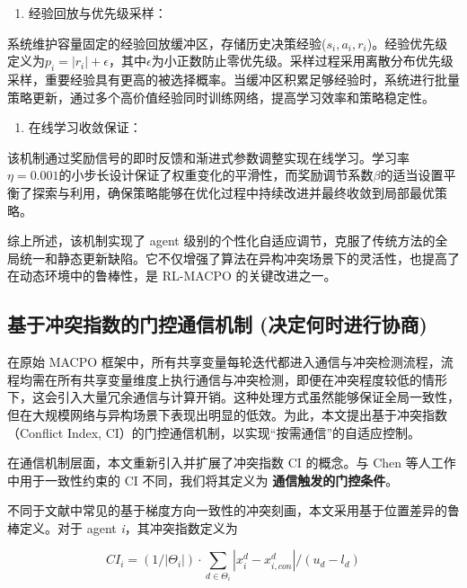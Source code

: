 \documentclass[12pt]{ctexart}
\begin{document}
\begin{enumerate}
\def\labelenumi{\alph{enumi})}
\setcounter{enumi}{3}
\item
  经验回放与优先级采样：
\end{enumerate}

系统维护容量固定的经验回放缓冲区，存储历史决策经验(\(s_{i},a_{i},r_{i}\))。经验优先级定义为\(p_{i} = \left| r_{i} \right| + \epsilon\)，其中\(\epsilon\)为小正数防止零优先级。采样过程采用离散分布优先级采样，重要经验具有更高的被选择概率。当缓冲区积累足够经验时，系统进行批量策略更新，通过多个高价值经验同时训练网络，提高学习效率和策略稳定性。

\begin{enumerate}
\def\labelenumi{\alph{enumi})}
\setcounter{enumi}{4}
\item
  在线学习收敛保证：
\end{enumerate}

该机制通过奖励信号的即时反馈和渐进式参数调整实现在线学习。学习率\(\eta = 0.001\)的小步长设计保证了权重变化的平滑性，而奖励调节系数\(\beta\)的适当设置平衡了探索与利用，确保策略能够在优化过程中持续改进并最终收敛到局部最优策略。

综上所述，该机制实现了 agent
级别的个性化自适应调节，克服了传统方法的全局统一和静态更新缺陷。它不仅增强了算法在异构冲突场景下的灵活性，也提高了在动态环境中的鲁棒性，是
RL-MACPO 的关键改进之一。

\subsection{基于冲突指数的门控通信机制
(决定何时进行协商)}\label{ux57faux4e8eux51b2ux7a81ux6307ux6570ux7684ux95e8ux63a7ux901aux4fe1ux673aux5236-ux51b3ux5b9aux4f55ux65f6ux8fdbux884cux534fux5546}

在原始 MACPO
框架中，所有共享变量每轮迭代都进入通信与冲突检测流程，流程均需在所有共享变量维度上执行通信与冲突检测，即便在冲突程度较低的情形下，这会引入大量冗余通信与计算开销。这种处理方式虽然能够保证全局一致性，但在大规模网络与异构场景下表现出明显的低效。为此，本文提出基于冲突指数（Conflict
Index, CI）的门控通信机制，以实现``按需通信''的自适应控制。

在通信机制层面，本文重新引入并扩展了冲突指数 CI 的概念。与 Chen
等人工作中用于一致性约束的 CI 不同，我们将其定义为
\textbf{通信触发的门控条件}。

不同于文献中常见的基于梯度方向一致性的冲突刻画，本文采用基于位置差异的鲁棒定义。对于
agent \emph{i}，其冲突指数定义为

\[CI_{i} = (1\text{/}|\Theta_{i}|) \cdot \sum_{d \in \Theta_{i}}^{}|x_{i}^{d} - x_{i,con}^{d}|\text{/}(u_{d} - l_{d})\]
\end{document}
